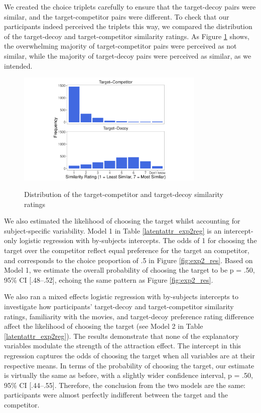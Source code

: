 \documentclass[12pt, a4paper]{article}
\begin{document}
We created the choice triplets carefully to ensure that the target-decoy pairs were similar, and the target-competitor pairs were different. To check that our participants indeed perceived the triplets this way, we compared the distribution of the target-decoy and target-competitor similarity ratings. As Figure \ref{fig:exp2_similarityratings} shows, the overwhelming majority of target-competitor pairs were perceived as not similar, while the majority of target-decoy pairs were perceived as similar, as we intended.

\begin{figure}[htb!]
\centering
\captionsetup{justification=centering}
		\caption{Distribution of the target-competitor and target-decoy similarity ratings}
\includegraphics[width=0.8\textwidth]{Figure5.pdf}
\label{fig:exp2_similarityratings}
\end{figure}

We also estimated the likelihood of choosing the target whilst accounting for subject-specific variability. Model 1 in Table \ref{latentattr_exp2reg} is an intercept-only logistic regression with by-subjects intercepts. The odds of 1 for choosing the target over the competitor reflect equal preference for the target an competitor, and corresponds to the choice proportion of .5 in Figure \ref{fig:exp2_res}. Based on Model 1, we estimate the overall probability of choosing the target to be p = .50, 95\% CI [.48--.52], echoing the same pattern as Figure \ref{fig:exp2_res}.

We also ran a mixed effects logistic regression with by-subjects intercepts to investigate how participants' target-decoy and target-competitor similarity ratings, familiarity with the movies, and target-decoy preference rating difference affect the likelihood of choosing the target (see Model 2 in Table \ref{latentattr_exp2reg}). The results demonstrate that none of the explanatory variables modulate the strength of the attraction effect. The intercept in this regression captures the odds of choosing the target when all variables are at their respective means. In terms of the probability of choosing the target, our estimate is virtually the same as before, with a slightly wider confidence interval, p = .50, 95\% CI [.44--.55]. Therefore, the conclusion from the two models are the same: participants were almost perfectly indifferent between the target and the competitor.
\end{document}
